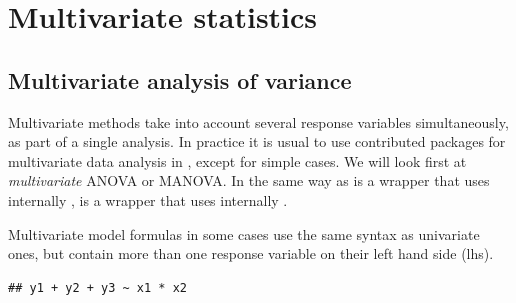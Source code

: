 \documentclass[krantz2]{krantz}\usepackage{knitr}%
\begin{document}
\section{Multivariate statistics}\label{sec:stat:MV}

\subsection{Multivariate analysis of variance}

Multivariate methods take into account several response variables simultaneously, as part of a single analysis. In practice it is usual to use contributed packages for multivariate data analysis in \Rlang, except for simple cases. We will look first at \emph{multivariate} ANOVA or MANOVA. In the same way as  is a wrapper that uses internally ,  is a wrapper that uses internally .

Multivariate model formulas in some cases use the same syntax as univariate ones, but contain more than one response variable on their left hand side (lhs).
\begin{knitrout}\footnotesize
{}\color{fgcolor}\begin{kframe}
\begin{alltt}
 \hlopt{+}  \hlopt{+}  \hlopt{~}  \hlopt{*} 
\end{alltt}
\begin{verbatim}
## y1 + y2 + y3 ~ x1 * x2
\end{verbatim}
\end{kframe}
\end{knitrout}
\end{document}
